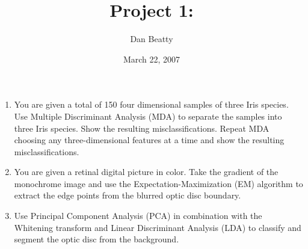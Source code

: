 \documentclass[11pt]{article}
\title{Project 1:}
\author{Dan Beatty}
\date{March 22, 2007}                                           %
\begin{document}
\maketitle

\begin{enumerate}
\item You are given a total of 150 four dimensional samples of three Iris species.  Use Multiple Discriminant Analysis (MDA) to separate the samples into three Iris species. Show the resulting misclassifications.   Repeat MDA choosing any three-dimensional features at a time and show the resulting misclassifications.

\item You are given a retinal digital picture in color.  Take the gradient of the monochrome image and use the Expectation-Maximization (EM) algorithm to extract the edge points from the blurred optic disc boundary.

\item   Use Principal Component Analysis (PCA) in combination with the Whitening transform and Linear Discriminant Analysis (LDA) to classify and segment the optic disc from the background.
\end{enumerate}

 
\end{document}
